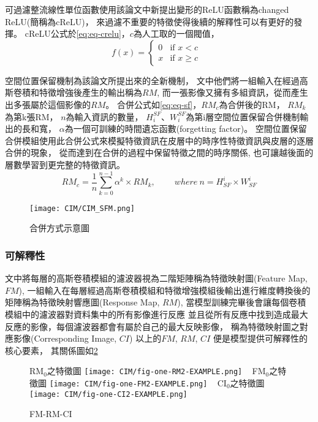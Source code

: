 \documentclass[class=NCU_thesis, crop=false]{standalone}
\begin{document}
可過濾整流線性單位函數使用該論文中新提出變形的ReLU函數稱為changed ReLU(簡稱為cReLU)，
來過濾不重要的特徵使得後續的解釋性可以有更好的發揮。
cReLU公式於\cref{eq:eq-crelu}，$c$為人工取的一個閥值，
\begin{equation}
    \label{eq:eq-crelu}
    f(x)= 
    \begin{cases}
        0 & \text{if  $x < c$ }\\
        x & \text{if  $x \geq c$}
    \end{cases}
\end{equation}

空間位置保留機制為該論文所提出來的全新機制，
文中他們將一組輸入在經過高斯卷積和特徵增強後產生的輸出稱為$RM$,
而一張影像又擁有多組資訊，從而產生出多張屬於這個影像的$RM$。
合併公式如\cref{eq:eq-sf}，$RM_{c}$為合併後的RM，
$RM_{k}$為第k張RM，
$n$為輸入資訊的數量，
${H}_{i}^{SF}$、${W}_{i}^{SF}$為第i層空間位置保留合併機制輸出的長和寬，
$\alpha$為一個可訓練的時間遺忘函數(forgetting factor)。
空間位置保留合併模組使用此合併公式來模擬特徵資訊在皮層中的時序性特徵資訊與皮層的逐層合併的現象，
從而達到在合併的過程中保留特徵之間的時序關係,
也可讓越後面的層數學習到更完整的特徵資訊。
\begin{equation}
    \label{eq:eq-sf}
    RM_{c}=\frac{1}{n} \sum_{k = 0}^{n-1} \alpha^{k} \times RM_{k},  \qquad \ where\ n = \textit{H}^{i}_{SF} \times \textit{W}^{i}_{SF}
\end{equation}

\begin{figure}[H]
  \centering
  \texttt{[image: CIM/CIM\_SFM.png]}
  \caption{合併方式示意圖~\cite{YangCNNInterpretable}}
  \label{fig:CIM_SFM}
\end{figure}


\subsubsection{可解釋性}
文中將每層的高斯卷積模組的濾波器視為二階矩陣稱為特徵映射圖(Feature Map, $FM$),
一組輸入在每層經過高斯卷積模組和特徵增強模組後輸出進行維度轉換後的矩陣稱為特徵映射響應圖(Response Map, $RM$),
當模型訓練完畢後會讓每個卷積模組中的濾波器對資料集中的所有影像進行反應
並且從所有反應中找到造成最大反應的影像，每個濾波器都會有屬於自己的最大反映影像，
稱為特徵映射圖之對應影像(Corresponding Image, $CI$)
以上的$FM$, $RM$, $CI$ 便是模型提供可解釋性的核心要素，
其關係圖如\cref{fig:one-FM2-RM2-CI2-EXAMPLE}

\begin{figure}[H]
    \centering
    \subcaptionbox
        {RM$_{0}$之特徵圖
        \label{fig:one-RM2-EXAMPLE}}
        {\texttt{[image: CIM/fig-one-RM2-EXAMPLE.png]}}
    ~
    \subcaptionbox
        {FM$_{0}$之特徵圖
        \label{fig:one-FM2-EXAMPLE}}
        {\texttt{[image: CIM/fig-one-FM2-EXAMPLE.png]}}
    ~
    \subcaptionbox
        {CI$_{0}$之特徵圖
        \label{fig:one-CI2-EXAMPLE}}
        {\texttt{[image: CIM/fig-one-CI2-EXAMPLE.png]}}
    \caption{FM-RM-CI\cite{YangCNNInterpretable}}
    \label{fig:one-FM2-RM2-CI2-EXAMPLE}
\end{figure}
\end{document}
